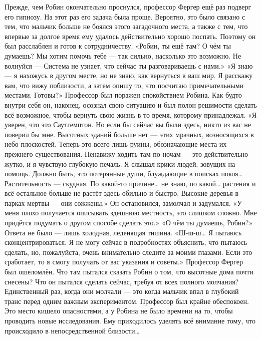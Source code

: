 \documentclass[a4paper,12pt]{book}
\begin{document}
	Прежде, чем Робин окончательно проснулся, профессор Фергер ещё раз подверг его гипнозу. На этот раз его задача была проще. Вероятно, это было связано с тем, что мальчик больше не боялся этого загадочного места, а также с тем, что впервые за долгое время ему удалось действительно хорошо поспать. Поэтому он был расслаблен и готов к сотрудничеству.
	«Робин, ты ещё там? О чём ты думаешь? Мы хотим помочь тебе — так сильно, насколько это возможно. Не волнуйся — Система не узнает, что сейчас ты разговариваешь с нами.»
	«Я знаю — я нахожусь в другом месте, но не знаю, как вернуться в ваш мир. Я расскажу вам, что вижу поблизости, а затем опишу то, что посчитаю примечательными местами. Готовы?»
	Профессор был поражен спокойствием Робина. Как будто внутри себя он, наконец, осознал свою ситуацию и был полон решимости сделать всё возможное, чтобы вернуть свою жизнь в то время, которому принадлежал.
	«Я уверен, что это Саутгемптон. Но если бы сейчас вы были здесь, никто из вас не поверил бы мне. Высотных зданий больше нет — этих мрачных, возносящихся в небо плоскостей. Теперь это всего лишь руины, обозначающие места их прежнего существования. Ненавижу ходить там по ночам — это действительно жутко, и я чувствую глубокую печаль. Я слышал крики людей, зовущих на помощь. Должно быть, это потерянные души, блуждающие в поисках покоя… Растительность — скудная. По какой-то причине…  не знаю, по какой… растения и всё остальное больше не растёт здесь обильно и быстро. Высокие деревья в парках мертвы — они сожжены.»
	Он остановился, замолчал и задумался.
	«У меня плохо получается описывать здешнюю местность, это слишком сложно. Мне придётся подумать о другом способе сделать это.»
	«О чём ты думаешь, Робин?»
	Ответа не было — лишь холодная, леденящая тишина.
	«Ш-ш-ш… Я пытаюсь сконцентрироваться. Я не могу сейчас в подробностях объяснить, что пытаюсь сделать, но, пожалуйста, очень внимательно следите за моими глазами. Если это сработает, то я смогу получать от вас указания и советы.»
	Профессор Фергер был ошеломлён. Что там пытался сказать Робин о том, что высотные дома почти снесены? Что он пытался сделать сейчас, требуя от всех полного молчания?  Единственный раз, когда они молчали — это когда мальчик впал в глубокий транс перед одним важным экспериментом. Профессор был крайне обеспокоен. Это место кишело опасностями, а у Робина не было времени на то, чтобы проводить новые исследования. Ему приходилось уделять всё внимание тому, что происходило в непосредственной близости…
\end{document}
